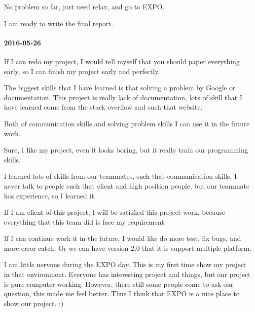 No problem so far, just need relax, and go to EXPO.


I am ready to write the final report.

\paragraph{2016-05-26}
If I can redo my project, I would tell myself that you should paper everything early, so I can finish my project early and perfectly.


The biggest skills that I have learned is that solving a problem by Google or documentation. This project is really lack of documentation, lots of skill that I have learned come from the stack overflow and such that website.


Both of communication skills and solving problem skills I can use it in the future work.


Sure, I like my project, even it looks boring, but it really train our programming skills.


I learned lots of skills from our teammates, such that communication skills. I never talk to people such that client and high position people, but our teammate has experience, so I learned it.


If I am client of this project, I will be satisfied this project work, because everything that this team did is face my requirement.


If I can continue work it in the future, I would like do more test, fix bugs, and more error catch. Or we can have version 2.0 that it is support multiple platform.


I am little nervous during the EXPO day. This is my first time show my project in that environment. Everyone has interesting project and things, but our project is pure computer working. However, there still some people come to ask our question, this made me feel better. Thus I think that EXPO is a nice place to show our project. :)
